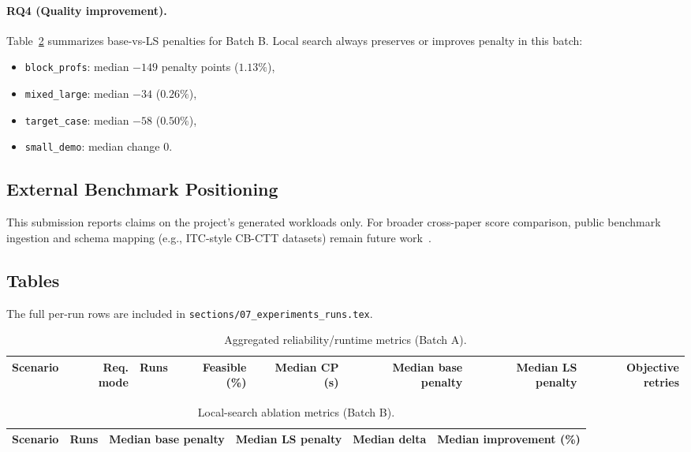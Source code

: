 \paragraph{RQ4 (Quality improvement).}
Table~\ref{tab:ls} summarizes base-vs-LS penalties for Batch B.
Local search always preserves or improves penalty in this batch:
\begin{itemize}[leftmargin=*]
  \item \texttt{block\_profs}: median \(-149\) penalty points (\(1.13\%\)),
  \item \texttt{mixed\_large}: median \(-34\) (\(0.26\%\)),
  \item \texttt{target\_case}: median \(-58\) (\(0.50\%\)),
  \item \texttt{small\_demo}: median change \(0\).
\end{itemize}

\subsection{External Benchmark Positioning}
This submission reports claims on the project's generated workloads only.
For broader cross-paper score comparison, public benchmark ingestion and schema mapping (e.g., ITC-style CB-CTT datasets)
remain future work~\cite{itc2007_track3,mccollum2010itc,bonutti2012benchmarking,bettinelli2015overview}.

\subsection{Tables}
The full per-run rows are included in \texttt{sections/07\_experiments\_runs.tex}.

\begin{table}[h]
\centering
\small
\begin{tabular}{lrrrrrrr}
\toprule
Scenario & Req. mode & Runs & Feasible (\%) & Median CP (s) & Median base penalty & Median LS penalty & Objective retries \\
\midrule

\bottomrule
\end{tabular}
\caption{Aggregated reliability/runtime metrics (Batch A).}
\label{tab:perf}
\end{table}

\begin{table}[h]
\centering
\small
\begin{tabular}{lrrrrr}
\toprule
Scenario & Runs & Median base penalty & Median LS penalty & Median delta & Median improvement (\%) \\
\midrule

\bottomrule
\end{tabular}
\caption{Local-search ablation metrics (Batch B).}
\label{tab:ls}
\end{table}
